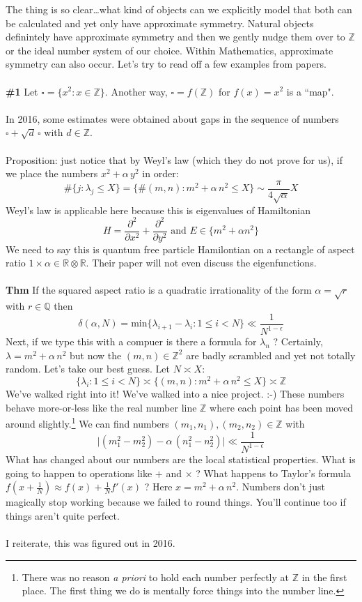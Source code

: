 \documentclass[12pt]{article}
\begin{document}
\noindent The thing is so clear\dots what kind of objects can we explicitly model that both can be calculated and yet only have approximate symmetry.  Natural objects definintely have approximate symmetry and then we gently nudge them over to $\mathbb{Z}$ or the ideal number system of our choice.  Within Mathematics, approximate symmetry can also occur. Let's try to read off a few examples from papers. \\ \\
\textbf{\#1} Let $\square = \{ x^2 : x \in \mathbb{Z}\}$.  Another way, $\square = f(\mathbb{Z})$ for $f(x) = x^2$ is a ``map".  \\ \\
In 2016, some estimates were obtained about gaps in the sequence of numbers $\square + \sqrt{d} \, \square$ with $d \in \mathbb{Z}$.  \\ \\
Proposition: just notice that by Weyl's law (which they do not prove for us), if we place the numbers $x^2 + \alpha \, y^2 $ in order:
$$ \#\{ j :  \lambda_j \leq X \} = \{ \# (m,n) : m^2 + \alpha \, n^2 \leq X \} \sim \frac{\pi}{4 \sqrt{\alpha}} X  $$
Weyl's law is applicable here because this is eigenvalues of Hamiltonian 
$$  H =  \frac{\partial^2 }{\partial x^2} + \frac{\partial^2 }{\partial y^2} \text{ and }E \in \{ m^2 + \alpha n^2 \} $$
We need to say this is quantum free particle Hamilontian on a rectangle of aspect ratio $1 \times \alpha \in \mathbb{R} \otimes \mathbb{R}$.  Their paper will not even discuss the eigenfunctions.  \\ \\
\textbf{Thm} If the squared aspect ratio is a quadratic irrationality of the form $\alpha = \sqrt{r}$ with $r \in \mathbb{Q}$ then 
$$ \delta(\alpha, N) = \text{min} \{ \lambda_{i+1} - \lambda_i : 1 \leq i < N \} \ll \frac{1}{N^{1-\epsilon}} $$ 
Next, if we type this with a compuer is there a formula for $\lambda_n$ ? Certainly, $\lambda = m^2 + \alpha \, n^2 $  but now the $(m,n) \in \mathbb{Z}^2$ are badly scrambled and yet not totally random. Let's take our best guess.  Let $N \asymp X$:
$$ \{ \lambda_i : 1 \leq i < N \} \asymp
\{ (m,n): m^2 + \alpha \, n^2 \leq X \} \asymp \mathbb{Z} $$
We've walked right into it!  We've walked into a nice project. :-) These numbers behave more-or-less like the real number line $\mathbb{Z}$ where each point has been moved around slightly.\footnote{There was no reason \textit{a priori} to hold each number perfectly at $\mathbb{Z}$ in the first place.  The first thing we do is mentally force things into the number line.} We can find numbers $(m_1, n_1), (m_2, n_2) \in \mathbb{Z}$ with 
$$ \big| (m_1^2 - m_2^2) -  \alpha \, (n_1^2 - n_2^2) \big| \ll \frac{1}{N^{1-\epsilon}} $$
What has changed about our numbers are the local statistical properties.  What is going to happen to operations like $+$ and $\times$ ? What happens to Taylor's formula $f(x + \frac{1}{N}) \approx f(x) + \frac{1}{N}f'(x)$ ? Here $x = m^2 + \alpha \, n^2$.  Numbers don't just magically stop working because we failed to round things.  You'll continue too if things aren't quite perfect. \\ \\
I reiterate, this was figured out in 2016. 
\end{document}
